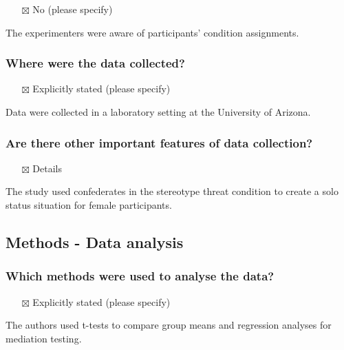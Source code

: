 \documentclass[
  doc, a4paper]{apa7}
\providecommand{\tightlist}{%
  \setlength{\itemsep}{0pt}\setlength{\parskip}{0pt}}
\begin{document}
\begin{itemize}
\tightlist
\item[$\boxtimes$]
  No (please specify)
\end{itemize}

The experimenters were aware of participants' condition assignments.

\subsubsection{Where were the data collected?}\label{where-were-the-data-collected}

\begin{itemize}
\tightlist
\item[$\boxtimes$]
  Explicitly stated (please specify)
\end{itemize}

Data were collected in a laboratory setting at the University of Arizona.

\subsubsection{Are there other important features of data collection?}\label{are-there-other-important-features-of-data-collection}

\begin{itemize}
\tightlist
\item[$\boxtimes$]
  Details
\end{itemize}

The study used confederates in the stereotype threat condition to create a solo status situation for female participants.

\subsection{Methods - Data analysis}\label{methods---data-analysis}

\subsubsection{Which methods were used to analyse the data?}\label{which-methods-were-used-to-analyse-the-data}

\begin{itemize}
\tightlist
\item[$\boxtimes$]
  Explicitly stated (please specify)
\end{itemize}

The authors used t-tests to compare group means and regression analyses for mediation testing.
\end{document}
